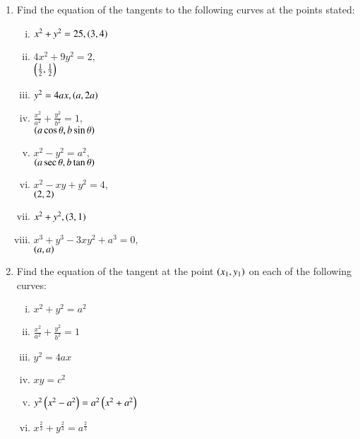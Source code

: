\begin{enumerate}[1.]
\item Find the equation of the tangents to the following curves at the points stated:
\begin{multicols}{2}
\begin{enumerate}[(i)]
\item
$
x^2+y^2 = 25, \left(3,4\right)
$
\item
$
4x^2+9y^2 = 2,
$
\\
$ \left(\frac{1}{2},\frac{1}{2}\right)
$
\item
$
y^2=4ax, \left(a,2a\right)
$
\item
$
\frac{x^2}{a^2}+\frac{y^2}{b^2}=1,$
\\
$ \left(a\cos\theta,b\sin\theta\right)
$
\item
$
x^2-y^2 = a^2,$
\\
$ \left(a\sec\theta,b\tan\theta\right)
$
\item
$
x^2-xy+y^2=4,$
\\
$ \left(2,2\right)
$
\item
$
x^2+y^2, \left(3,1\right)
$
\item
$
x^3+y^3-3xy^2+a^3 = 0,$
\\
$ \left(a,a\right)
$
\end{enumerate}
\end{multicols}
\item Find the equation of the tangent at the point $\left(x_1,y_1\right)$ on each
of the following curves:
\begin{multicols}{2}
\begin{enumerate}[(i)]
\item
$
x^2+y^2 = a^2
$
\item
$
\frac{x^2}{a^2}+\frac{y^2}{b^2}= 1
$
\item
$
y^2 = 4ax
$
\item
$
xy=c^2
$
\item
$
y^2\left(x^2-a^2\right)=a^2\left(x^2+a^2\right)
$
\item
$
x^{\frac{2}{3}}+y^{\frac{2}{3}}=a^{\frac{2}{3}}
$
\end{enumerate}
\end{multicols}
\end{enumerate}